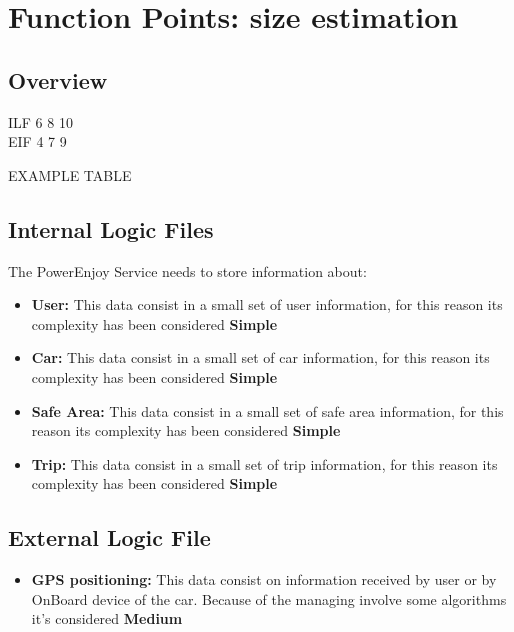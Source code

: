 
\section{Function Points: size estimation}
\subsection{Overview} %


ILF 6 8 10 \\
EIF 4 7 9

EXAMPLE TABLE


\subsection{Internal Logic Files} %

The PowerEnjoy Service needs to store information about:

\begin{itemize}
	\item \textbf{User:} This data consist in a small set of user information, for this reason its complexity has been considered \textbf{Simple}
	\item \textbf{Car:} This data consist in a small set of car information, for this reason its complexity has been considered \textbf{Simple}
	\item \textbf{Safe Area:} This data consist in a small set of safe area information, for this reason its complexity has been considered \textbf{Simple}
	\item \textbf{Trip:} This data consist in a small set of trip information, for this reason its complexity has been considered \textbf{Simple}
\end{itemize}

\subsection{External Logic File} %

\begin{itemize}
	\item \textbf{GPS positioning:} This data consist on information received by user or by OnBoard device of the car. Because of the managing involve some algorithms it's considered \textbf{Medium}
\end{itemize}

